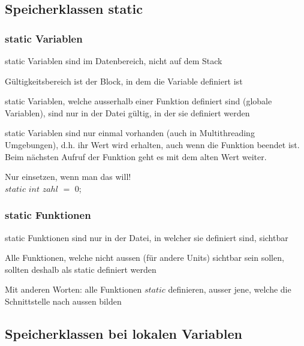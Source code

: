 			\subsection{Speicherklassen static }
				\begin{minipage}[t]{9 cm}
					\subsubsection{static Variablen}
					\begin{compactitem}
						\item static Variablen sind im Datenbereich, nicht auf dem Stack
						\item Gültigkeitsbereich ist der Block, in dem die Variable definiert ist
						\item static Variablen, welche ausserhalb einer Funktion definiert sind (globale Variablen), sind nur in der Datei gültig, in der sie definiert werden
						\item static Variablen sind nur einmal vorhanden (auch in Multithreading Umgebungen), d.h. ihr Wert wird erhalten, auch wenn die Funktion beendet ist. Beim nächsten Aufruf der Funktion geht es mit dem alten Wert weiter.
						\item Nur einsetzen, wenn man das will!\\
						$static$ $int$ $zahl$ $=$ $0$;
					\end{compactitem}
				\end{minipage}
				\hspace*{0.5cm}
				\begin{minipage}[t]{9 cm}
					\subsubsection{static Funktionen}
					\begin{compactitem}
						\item static Funktionen sind nur in der Datei, in welcher sie definiert sind,
						sichtbar
						\item Alle Funktionen, welche nicht aussen (für andere Units) sichtbar sein
						sollen, sollten deshalb als static definiert werden
						\item Mit anderen Worten: alle Funktionen $static$ definieren, ausser jene, welche die Schnittstelle
						nach aussen bilden
					\end{compactitem}
				\end{minipage}
			\subsection{Speicherklassen bei lokalen Variablen }

